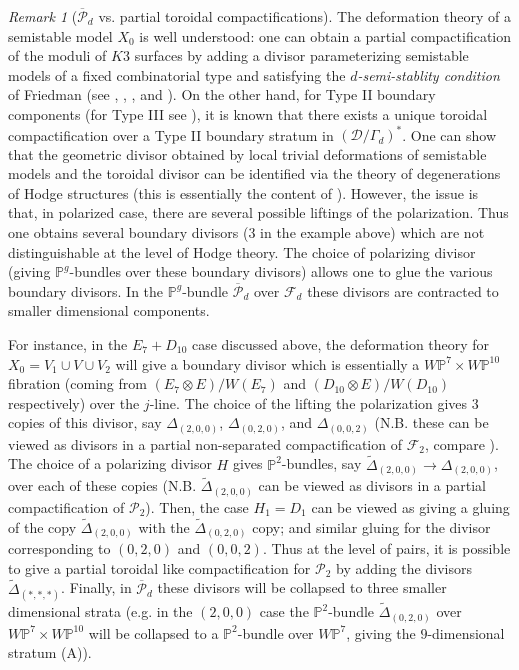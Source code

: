 \documentclass{amsart}
\numberwithin{equation}{section}
\theoremstyle{plain}
\theoremstyle{remark}
\newtheorem{remark}[equation]{Remark}
\theoremstyle{definition}
\newcommand{\bP}{\mathbb{P}}
\newcommand{\calF}{\mathcal{F}}
\newcommand{\calP}{\mathcal{P}}
\newcommand{\calD}{\mathcal{D}}
\begin{document}
\begin{remark}[$\overline{\calP}_d$ vs. partial toroidal compactifications]\label{remtoroidal}
The deformation theory of a semistable model $X_0$ is well understood:  one can obtain a partial compactification of the moduli of $K3$ surfaces by adding a divisor parameterizing semistable models of a fixed combinatorial type and satisfying the {\it $d$-semi-stablity condition} of Friedman (see  \cite[\S4]{friedmanannals}, \cite{friedmansmooth}, \cite{kn}, and \cite{olsson}). On the other hand, for Type II boundary components (for Type III see \cite{friedmanscattone}), it is known that there exists a unique toroidal compactification over a Type II boundary stratum in $(\calD/\Gamma_d)^*$. One can show that the geometric divisor obtained by local trivial deformations of semistable models and the toroidal divisor can be identified via the theory of degenerations of Hodge structures (this is essentially the content of \cite{friedmanannals}). However, the issue is that, in polarized case, there are several possible liftings of the polarization. Thus one obtains several boundary divisors ($3$ in the example above) which are not distinguishable at the level of Hodge theory. The choice of polarizing divisor (giving $\bP^g$-bundles over these boundary divisors) allows one to glue the various boundary divisors. In the $\bP^g$-bundle $\overline{\calP}_d$ over $\calF_d$ these divisors are contracted to smaller dimensional components.

For instance, in the $E_7+D_{10}$ case discussed above, the deformation theory for $X_0=V_1\cup V\cup V_2$ will give a boundary divisor which is essentially a $W\bP^7\times W\bP^{10}$ fibration (coming from $(E_7\otimes E)/W(E_7)$ and $(D_{10}\otimes E)/W(D_{10})$ respectively) over the $j$-line. The choice of the lifting the polarization gives $3$ copies of this divisor, say $\Delta_{(2,0,0)}$, $\Delta_{(0,2,0)}$, and $\Delta_{(0,0,2)}$ (N.B. these can be viewed as divisors in a partial non-separated compactification of $\calF_2$, compare \cite{olsson}). The choice of a polarizing divisor $H$ gives $\bP^2$-bundles, say $\widetilde\Delta_{(2,0,0)}\to \Delta_{(2,0,0)}$, over each of these copies (N.B. $\widetilde\Delta_{(2,0,0)}$ can be viewed as divisors in a partial compactification of $\calP_2$). Then, the case $H_1=D_1$ can be viewed as giving a gluing of the copy $\widetilde\Delta_{(2,0,0)}$ with the $\widetilde\Delta_{(0,2,0)}$ copy; and similar gluing for the divisor corresponding to $(0,2,0)$ and $(0,0,2)$. Thus at the level of pairs, it is possible to give a partial toroidal like compactification for $\calP_2$ by adding the divisors $\widetilde\Delta_{(*,*,*)}$. Finally, in $\overline{\calP}_d$ these divisors will be collapsed to three smaller dimensional strata (e.g. in the $(2,0,0)$ case the $\bP^2$-bundle $\widetilde\Delta_{(0,2,0)}$ over $W\bP^{7}\times W\bP^{10}$ will be collapsed to a $\bP^2$-bundle over $W\bP^{7}$, giving the $9$-dimensional stratum (A)). 
\end{remark}
\end{document}
